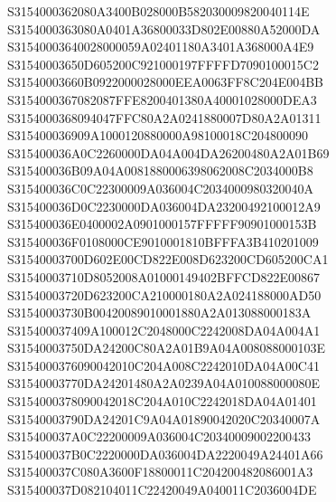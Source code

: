 \documentclass[12pt,a4paper]{article}
\begin{document}
\begin{framed}
{S3154000362080A3400B028000B582030009820040114E\newline
S3154000363080A0401A36800033D802E00880A52000DA\newline
S31540003640028000059A02401180A3401A368000A4E9\newline
S31540003650D605200C921000197FFFFD7090100015C2\newline
S31540003660B0922000028000EEA0063FF8C204E004BB\newline
S3154000367082087FFE8200401380A40001028000DEA3\newline
S3154000368094047FFC80A2A0241880007D80A2A01311\newline
S315400036909A1000120880000A98100018C204800090\newline
S315400036A0C2260000DA04A004DA26200480A2A01B69\newline
S315400036B09A04A0081880006398062008C2034000B8\newline
S315400036C0C22300009A036004C2034000980320040A\newline
S315400036D0C2230000DA036004DA23200492100012A9\newline
S315400036E0400002A0901000157FFFFF90901000153B\newline
S315400036F0108000CE9010001810BFFFA3B410201009\newline
S31540003700D602E00CD822E008D623200CD605200CA1\newline
S31540003710D8052008A01000149402BFFCD822E00867\newline
S31540003720D623200CA210000180A2A024188000AD50\newline
S31540003730B00420089010001880A2A013088000183A\newline
S315400037409A100012C2048000C2242008DA04A004A1\newline
S31540003750DA24200C80A2A01B9A04A008088000103E\newline
S3154000376090042010C204A008C2242010DA04A00C41\newline
S31540003770DA24201480A2A0239A04A010088000080E\newline
S3154000378090042018C204A010C2242018DA04A01401\newline
S31540003790DA24201C9A04A01890042020C20340007A\newline
S315400037A0C22200009A036004C20340009002200433\newline
S315400037B0C2220000DA036004DA2220049A24401A66\newline
S315400037C080A3600F18800011C204200482086001A3\newline
S315400037D082104011C22420049A040011C2036004DE\newline
}
\end{framed}
\end{document}
